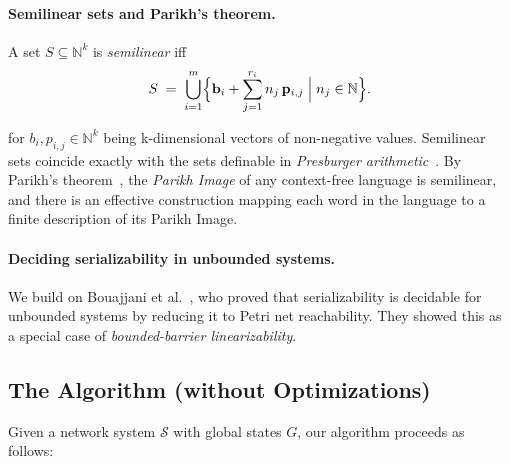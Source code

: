 %

\paragraph{Semilinear sets and Parikh’s theorem.}
A set \(S\subseteq\mathbb N^k\) is \emph{semilinear} iff
\[
S \;=\; \bigcup_{i=1}^m \Bigl\{\mathbf b_i + \sum_{j=1}^{r_i} n_j\,\mathbf p_{i,j}
\;\Big|\; n_j\in\mathbb N\Bigr\}.
\]

for $b_i, p_{i,j}\in \mathbb N^k$ being k-dimensional vectors of non-negative values.
%
Semilinear sets coincide exactly with the sets definable in \textit{Presburger arithmetic}~\cite{Pr29}.
%
By Parikh's theorem~\cite{Parikh66}, the \textit{Parikh Image} of any context-free language is semilinear, and there is an effective construction mapping each word in the language to a
finite description of its Parikh Image.

\paragraph{Deciding serializability in unbounded systems.}

We build on Bouajjani et al.~\cite{BoEmEnHa13}, who proved that serializability is decidable for unbounded systems by reducing it to Petri net reachability. They showed this as a special case of \textit{bounded-barrier linearizability}.



\subsection{The Algorithm (without Optimizations)}

Given a network system \(\mathcal S\) with global states \(G\), our algorithm proceeds as follows:  

